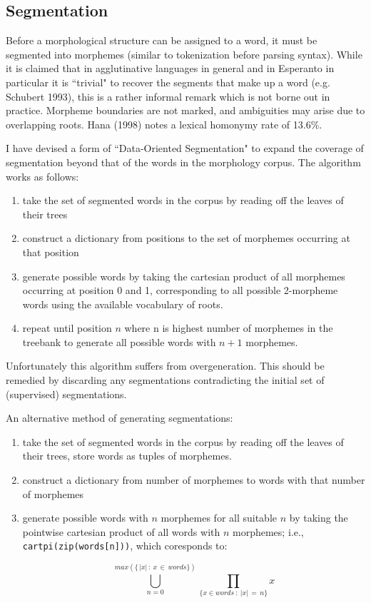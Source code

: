 \documentclass[10pt,a4paper]{article}
\begin{document}
\subsection{Segmentation}

Before a morphological structure can be assigned to a word, it must be
segmented into morphemes (similar to tokenization before parsing syntax). While
it is claimed that in agglutinative languages in general and in Esperanto in
particular it is ``trivial" to recover the segments that make up a word (e.g.
Schubert 1993), this is a rather informal remark which is not borne out in
practice.  Morpheme boundaries are not marked, and ambiguities may arise due to
overlapping roots. Hana (1998) notes a lexical homonymy rate of 13.6\%.

I have devised a form of ``Data-Oriented Segmentation" to expand the
coverage of segmentation beyond that of the words in the morphology corpus. The
algorithm works as follows:

\begin{enumerate}
\item take the set of segmented words in the corpus by reading off the leaves
of their trees

\item construct a dictionary from positions to the set of morphemes occurring
at that position

\item generate possible words by taking the cartesian product of all morphemes
occurring at position 0 and 1, corresponding to all possible 2-morpheme words
using the available vocabulary of roots.

\item repeat until position $n$ where n is highest number of morphemes in the
treebank to generate all possible words with $n+1$ morphemes.

\end{enumerate}

Unfortunately this algorithm suffers from overgeneration. This should be
remedied by discarding any segmentations contradicting the initial set of
(supervised) segmentations. 

An alternative method of generating segmentations:

\begin{enumerate}
\item take the set of segmented words in the corpus by reading off the leaves
of their trees, store words as tuples of morphemes.

\item construct a dictionary from number of morphemes to words with that number
of morphemes

\item generate possible words with $n$ morphemes for all suitable $n$ by taking
the pointwise cartesian product of all words with $n$ morphemes; i.e.,
\texttt{cartpi(zip(words[n]))}, which coresponds to:

\[ \displaystyle\bigcup_{n=0}^{ max(\{ \, \vert x \vert \, : \: x \, \in \, words\}) }\prod_{\{x \in words \: : \: \vert x\vert \, = \, n\}} x \]

\end{enumerate}
\end{document}
